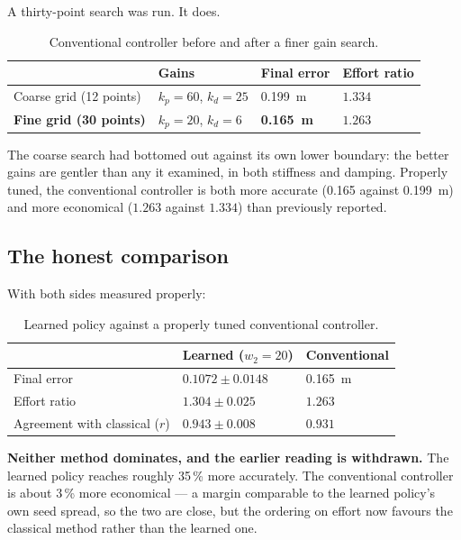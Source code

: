 A thirty-point search was run. It does.

\begin{table}[H]
\centering
\caption{Conventional controller before and after a finer gain search.}
\begin{tabular}{@{} L{5.0cm} C{3.0cm} C{3.0cm} C{2.4cm} @{}}
\toprule
& \textbf{Gains} & \textbf{Final error} & \textbf{Effort ratio} \\
\midrule
Coarse grid (12 points) & $k_p=60$, $k_d=25$ & \SI{0.199}{\meter} & $1.334$ \\
\textbf{Fine grid (30 points)} & $k_p=20$, $k_d=6$ & \textbf{\SI{0.165}{\meter}} & $\mathbf{1.263}$ \\
\bottomrule
\end{tabular}
\label{tab:finegains}
\end{table}

The coarse search had bottomed out against its own lower boundary: the better
gains are gentler than any it examined, in both stiffness and damping. Properly
tuned, the conventional controller is both more accurate
(\SI{0.165}{} against \SI{0.199}{\meter}) and more economical
($1.263$ against $1.334$) than previously reported.

\subsection{The honest comparison}

With both sides measured properly:

\begin{table}[H]
\centering
\caption{Learned policy against a properly tuned conventional controller.}
\begin{tabular}{@{} L{5.6cm} C{3.4cm} C{3.4cm} @{}}
\toprule
& \textbf{Learned ($w_2 = 20$)} & \textbf{Conventional} \\
\midrule
Final error & $\mathbf{0.1072 \pm 0.0148}$ & \SI{0.165}{\meter} \\
Effort ratio & $1.304 \pm 0.025$ & $\mathbf{1.263}$ \\
Agreement with classical ($r$) & $\mathbf{0.943 \pm 0.008}$ & $0.931$ \\
\bottomrule
\end{tabular}
\label{tab:honest}
\end{table}

\textbf{Neither method dominates, and the earlier reading is withdrawn.} The
learned policy reaches roughly 35\,\% more accurately. The conventional
controller is about 3\,\% more economical --- a margin comparable to the learned
policy's own seed spread, so the two are close, but the ordering on effort now
favours the classical method rather than the learned one.

